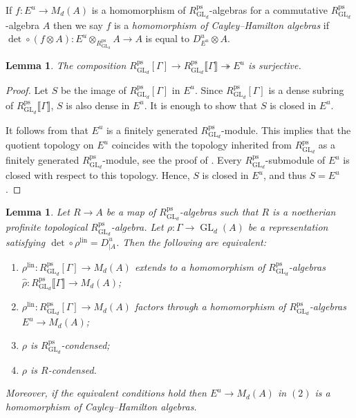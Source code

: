 \documentclass{amsart}
\newtheorem{lem}[prop]{Lemma}
\theoremstyle{definition}
\theoremstyle{remark}
\DeclareMathOperator{\GL}{GL}
\newcommand{\br}[1]{\llbracket #1\rrbracket}
\newcommand{\ps}{\mathrm{ps}}
\newcommand{\RpsGLd}{R^{\ps}_{\GL_d}}
\newcommand{\lin}{\mathrm{lin}}
\begin{document}
If $f: E^u \rightarrow M_d(A)$ is a homomorphism of $\RpsGLd$-algebras for a commutative $\RpsGLd$-algebra $A$ then we say $f$ is a
\emph{homomorphism of Cayley--Hamilton algebras} 
if $\det \circ (f \otimes A): E^u \otimes_{\RpsGLd} A \rightarrow A$ is equal to $D^u_{E^u} \otimes A$.

\begin{lem}\label{surj} The composition
$\RpsGLd[\Gamma]\rightarrow
\RpsGLd\br{\Gamma}\twoheadrightarrow E^u$
is surjective. 
\end{lem}
\begin{proof} Let $S$ be the image of $\RpsGLd[\Gamma]$
 in $E^u$. Since $\RpsGLd[\Gamma]$ is a dense subring of $\RpsGLd\br{\Gamma}$, $S$  is also dense in $E^u$. It is enough to show that $S$ is closed in $E^u$.

It follows from \cite[Proposition 3.6]{WE_alg} that $E^u$ is a finitely generated $\RpsGLd$-module. This implies that the 
quotient topology on $E^u$ coincides with the topology 
inherited from $\RpsGLd$ as a finitely generated $\RpsGLd$-module, see the proof of \cite[Lemma 3.2]{BIP_new}.
Every $\RpsGLd$-submodule of $E^u$ is closed with respect 
to this topology. Hence, $S$ is closed in $E^u$, and thus 
$S=E^u$. 
\end{proof}

\begin{lem}\label{factors_through_Eu} Let $R\rightarrow A$ be a map of $\RpsGLd$-algebras such that $R$ is a noetherian profinite topological $\RpsGLd$-algebra. Let  $\rho : \Gamma \to \GL_d(A)$ be a 
representation satisfying $\det \circ \rho^{\lin} = D^u_{|A}$. Then the following are equivalent:
\begin{enumerate} 
\item $\rho^{\lin}:\RpsGLd[\Gamma]\rightarrow M_d(A)$ extends to a homomorphism of $\RpsGLd$-algebras
$\widehat{\rho}:\RpsGLd\br{\Gamma}\rightarrow M_d(A)$;
\item $\rho^{\lin}: \RpsGLd[\Gamma]\rightarrow M_d(A)$ factors through 
a homomorphism of  $\RpsGLd$-algebras $E^u\rightarrow M_d(A)$;
\item $\rho$ is $\RpsGLd$-condensed;
\item $\rho$ is $R$-condensed. 
\end{enumerate}
Moreover, if the equivalent conditions hold then $E^u\rightarrow M_d(A)$ in $(2)$ is 
a homomorphism of Cayley--Hamilton algebras. 
\end{lem}
\end{document}
